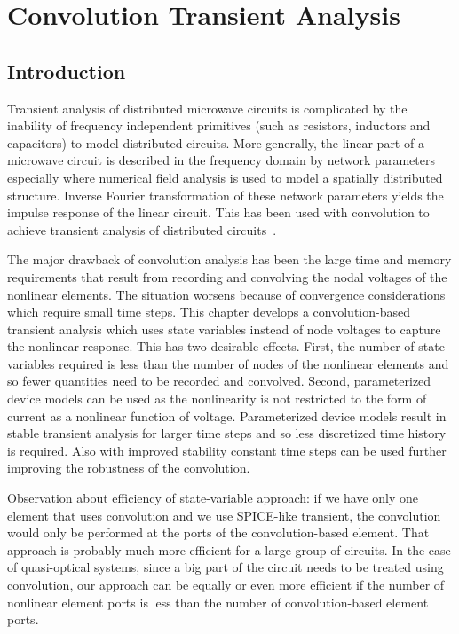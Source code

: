 
\chapter{Convolution Transient Analysis} \label{ch_svtr}

\section{Introduction}

Transient analysis of distributed microwave circuits is complicated by
the inability of frequency independent primitives (such as resistors,
inductors and capacitors) to model distributed circuits. More
generally, the linear part of a microwave circuit is described in the
frequency domain by network parameters especially where numerical
field analysis is used to model a spatially distributed
structure. Inverse Fourier transformation of these network parameters
yields the impulse response of the linear circuit. This has been used
with convolution to achieve transient analysis of distributed
circuits~\cite{basel:paper,Brazil:New,gamma,delta}.

The major drawback of convolution analysis has been the large time and
memory requirements that result from recording and convolving the
nodal voltages of the nonlinear elements. The situation worsens
because of convergence considerations which require small time
steps. This chapter develops a convolution-based transient analysis
which uses state variables instead of node voltages to capture the
nonlinear response. This has two desirable effects. First, the number
of state variables required is less than the number of nodes of the
nonlinear elements and so fewer quantities need to be recorded and
convolved. Second, parameterized device models can be used as the
nonlinearity is not restricted to the form of current as a nonlinear
function of voltage. Parameterized device models result in stable
transient analysis for larger time steps and so less discretized time
history is required. Also with improved stability constant time steps
can be used further improving the robustness of the convolution.

Observation about efficiency of state-variable approach: if we have
only one element that uses convolution and we use SPICE-like
transient, the convolution would only be performed at the ports of the
convolution-based element. That approach is probably much more
efficient for a large group of circuits. In the case of quasi-optical
systems, since a big part of the circuit needs to be treated using
convolution, our approach can be equally or even more efficient if the
number of nonlinear element ports is less than the number of
convolution-based element ports.



